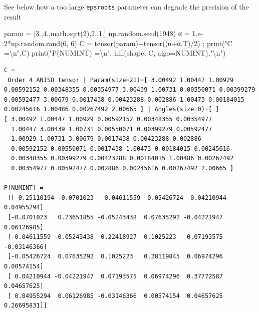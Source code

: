 \documentclass[
  letterpaper,
  DIV=11,
  numbers=noendperiod]{scrreprt}
\newenvironment{Shaded}{\begin{snugshade}}{\end{snugshade}}
\newcommand{\BuiltInTok}[1]{\textcolor[rgb]{0.00,0.23,0.31}{#1}}
\newcommand{\CharTok}[1]{\textcolor[rgb]{0.13,0.47,0.30}{#1}}
\newcommand{\DecValTok}[1]{\textcolor[rgb]{0.68,0.00,0.00}{#1}}
\newcommand{\FloatTok}[1]{\textcolor[rgb]{0.68,0.00,0.00}{#1}}
\newcommand{\NormalTok}[1]{\textcolor[rgb]{0.00,0.23,0.31}{#1}}
\newcommand{\OperatorTok}[1]{\textcolor[rgb]{0.37,0.37,0.37}{#1}}
\newcommand{\StringTok}[1]{\textcolor[rgb]{0.13,0.47,0.30}{#1}}
\begin{document}
See below how a too large \texttt{epsroots} parameter can degrade the
precision of the result

\begin{Shaded}
\begin{Highlighting}[]
\NormalTok{param }\OperatorTok{=}\NormalTok{ [}\FloatTok{3.}\NormalTok{,}\FloatTok{4.}\NormalTok{,math.sqrt(}\DecValTok{2}\NormalTok{),}\FloatTok{2.}\NormalTok{,}\FloatTok{1.}\NormalTok{]}
\NormalTok{np.random.seed(}\DecValTok{1948}\NormalTok{)}
\NormalTok{α }\OperatorTok{=} \FloatTok{1.e{-}2}\OperatorTok{*}\NormalTok{np.random.rand(}\DecValTok{6}\NormalTok{, }\DecValTok{6}\NormalTok{)}
\NormalTok{C }\OperatorTok{=}\NormalTok{ tensor(param)}\OperatorTok{+}\NormalTok{tensor((α}\OperatorTok{+}\NormalTok{α.T)}\OperatorTok{/}\DecValTok{2}\NormalTok{) }\OperatorTok{;} \BuiltInTok{print}\NormalTok{(}\StringTok{"C =}\CharTok{\textbackslash{}n}\StringTok{"}\NormalTok{,C)}
\BuiltInTok{print}\NormalTok{(}\StringTok{"P(NUMINT) =}\CharTok{\textbackslash{}n}\StringTok{"}\NormalTok{, hill(shape, C, algo}\OperatorTok{=}\NormalTok{NUMINT),}\StringTok{"}\CharTok{\textbackslash{}n}\StringTok{"}\NormalTok{)}
\end{Highlighting}
\end{Shaded}

\begin{verbatim}
C =
 Order 4 ANISO tensor | Param(size=21)=[ 3.00492 1.00447 1.00929 0.00592152 0.00348355 0.00354977 3.00439 1.00731 0.00550071 0.00399279 0.00592477 3.00679 0.0017438 0.00423288 0.002886 1.00473 0.00184015 0.00245616 1.00486 0.00267492 2.00665 ] | Angles(size=0)=[ ]
[ 3.00492 1.00447 1.00929 0.00592152 0.00348355 0.00354977 
  1.00447 3.00439 1.00731 0.00550071 0.00399279 0.00592477 
  1.00929 1.00731 3.00679 0.0017438 0.00423288 0.002886 
  0.00592152 0.00550071 0.0017438 1.00473 0.00184015 0.00245616 
  0.00348355 0.00399279 0.00423288 0.00184015 1.00486 0.00267492 
  0.00354977 0.00592477 0.002886 0.00245616 0.00267492 2.00665 ]

P(NUMINT) =
 [[ 0.25110194 -0.0701023  -0.04611559 -0.05426724  0.04210944  0.04955294]
 [-0.0701023   0.23651855 -0.05243438  0.07635292 -0.04221947  0.06126985]
 [-0.04611559 -0.05243438  0.22418927  0.1025223   0.07193575 -0.03146366]
 [-0.05426724  0.07635292  0.1025223   0.28119845  0.06974296  0.00574154]
 [ 0.04210944 -0.04221947  0.07193575  0.06974296  0.37772587  0.04657625]
 [ 0.04955294  0.06126985 -0.03146366  0.00574154  0.04657625  0.26695831]] 
\end{verbatim}
\end{document}
